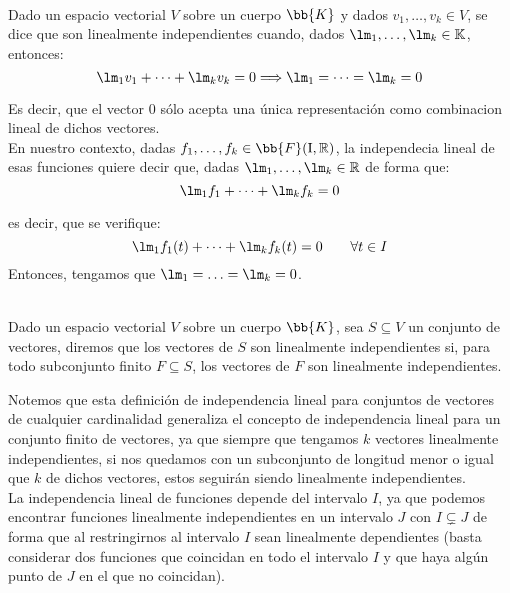 \begin{definicion}\ \\
    Dado un espacio vectorial $V$ sobre un cuerpo $\bb{K}$ y dados $v_1,\ldots,v_k \in V$, se dice que son linealmente independientes cuando, dados $\lm_1,\ldots,\lm_k\in \mathbb{K}$, entonces:
    \begin{equation*}
        \lm_1v_1 + \cdots + \lm_k v_k = 0 \Longrightarrow \lm_1 = \cdots = \lm_k = 0
    \end{equation*}
\end{definicion}
Es decir, que el vector 0 sólo acepta una única representación como combinacion lineal de dichos vectores.\\

En nuestro contexto, dadas $f_1,\ldots,f_k\in \bb{F}(\text{I},\mathbb{R})$, la independecia lineal de esas funciones quiere decir que, dadas $\lm_1,\ldots,\lm_k\in \mathbb{R}$ de forma que:
\begin{equation*}
    \lm_1f_1 + \cdots + \lm_k f_k = 0 
\end{equation*}

es decir, que se verifique:
\begin{equation*}
    \lm_1f_1(t) + \cdots + \lm_k f_k(t) = 0 \qquad \forall t\in I 
\end{equation*}
Entonces, tengamos que $\lm_1=\ldots=\lm_k = 0$.

\begin{definicion}\ \\
    Dado un espacio vectorial $V$ sobre un cuerpo $\bb{K}$, sea $S\subseteq V$ un conjunto de vectores, diremos que los vectores de $S$ son linealmente independientes si, para todo subconjunto finito $F\subseteq S$, los vectores de $F$ son linealmente independientes.
\end{definicion}
Notemos que esta definición de independencia lineal para conjuntos de vectores de cualquier cardinalidad generaliza el concepto de independencia lineal para un conjunto finito de vectores, ya que siempre que tengamos $k$ vectores linealmente independientes, si nos quedamos con un subconjunto de longitud menor o igual que $k$ de dichos vectores, estos seguirán siendo linealmente independientes.\\

La independencia lineal de funciones depende del intervalo $I$, ya que podemos encontrar funciones linealmente independientes en un intervalo $J$ con $I\subsetneq J$ de forma que al restringirnos al intervalo $I$ sean linealmente dependientes (basta considerar dos funciones que coincidan en todo el intervalo $I$ y que haya algún punto de $J$ en el que no coincidan).\\

